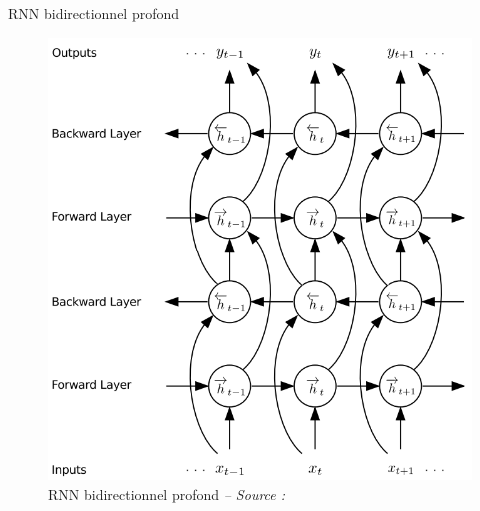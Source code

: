 \begin{frame}{RNN bidirectionnel profond}
    
    \begin{figure}
        \includegraphics[height=.75\textheight,width=\textwidth,keepaspectratio]{images/arch_dbrnn}
        \caption{RNN bidirectionnel profond {\scriptsize\it -- Source : \cite{Graves13b}}}
    \end{figure}
    
\end{frame}

